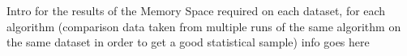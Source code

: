 \documentclass[../../ClusteringConnectionsMAIN.tex]{subfiles}
\begin{document}
\begin{flushleft}
\begin{large}

Intro for the results of the Memory Space required on each dataset, for each algorithm (comparison data taken from multiple runs of the same algorithm on the same dataset in order to get a good statistical sample) info goes here


\end{large}
\end{flushleft}
\end{document}
